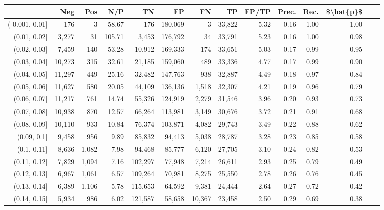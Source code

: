 \begin{tabular}{rrrrrrrrrrrrrr}
\toprule
{} &     Neg &    Pos &     N/P &       TN &       FP &      FN &      TP & FP/TP & Prec. &  Rec. & \$\textbackslash hat\{p\}\$ \\
\midrule
(-0.001, 0.01] &     176 &      3 &   58.67 &      176 &  180,069 &       3 &  33,822 &  5.32 &  0.16 &  1.00 &      1.00 \\
(0.01, 0.02]   &   3,277 &     31 &  105.71 &    3,453 &  176,792 &      34 &  33,791 &  5.23 &  0.16 &  1.00 &      0.98 \\
(0.02, 0.03]   &   7,459 &    140 &   53.28 &   10,912 &  169,333 &     174 &  33,651 &  5.03 &  0.17 &  0.99 &      0.95 \\
(0.03, 0.04]   &  10,273 &    315 &   32.61 &   21,185 &  159,060 &     489 &  33,336 &  4.77 &  0.17 &  0.99 &      0.90 \\
(0.04, 0.05]   &  11,297 &    449 &   25.16 &   32,482 &  147,763 &     938 &  32,887 &  4.49 &  0.18 &  0.97 &      0.84 \\
(0.05, 0.06]   &  11,627 &    580 &   20.05 &   44,109 &  136,136 &   1,518 &  32,307 &  4.21 &  0.19 &  0.96 &      0.79 \\
(0.06, 0.07]   &  11,217 &    761 &   14.74 &   55,326 &  124,919 &   2,279 &  31,546 &  3.96 &  0.20 &  0.93 &      0.73 \\
(0.07, 0.08]   &  10,938 &    870 &   12.57 &   66,264 &  113,981 &   3,149 &  30,676 &  3.72 &  0.21 &  0.91 &      0.68 \\
(0.08, 0.09]   &  10,110 &    933 &   10.84 &   76,374 &  103,871 &   4,082 &  29,743 &  3.49 &  0.22 &  0.88 &      0.62 \\
(0.09, 0.1]    &   9,458 &    956 &    9.89 &   85,832 &   94,413 &   5,038 &  28,787 &  3.28 &  0.23 &  0.85 &      0.58 \\
(0.1, 0.11]    &   8,636 &  1,082 &    7.98 &   94,468 &   85,777 &   6,120 &  27,705 &  3.10 &  0.24 &  0.82 &      0.53 \\
(0.11, 0.12]   &   7,829 &  1,094 &    7.16 &  102,297 &   77,948 &   7,214 &  26,611 &  2.93 &  0.25 &  0.79 &      0.49 \\
(0.12, 0.13]   &   6,967 &  1,061 &    6.57 &  109,264 &   70,981 &   8,275 &  25,550 &  2.78 &  0.26 &  0.76 &      0.45 \\
(0.13, 0.14]   &   6,389 &  1,106 &    5.78 &  115,653 &   64,592 &   9,381 &  24,444 &  2.64 &  0.27 &  0.72 &      0.42 \\
(0.14, 0.15]   &   5,934 &    986 &    6.02 &  121,587 &   58,658 &  10,367 &  23,458 &  2.50 &  0.29 &  0.69 &      0.38 \\

\end{tabular}
